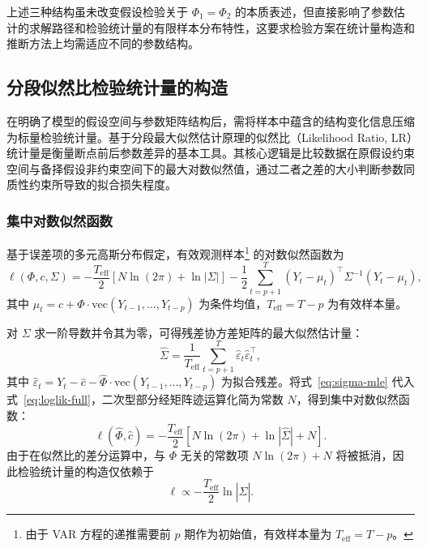 上述三种结构虽未改变假设检验关于 $\Phi_1 = \Phi_2$ 的本质表述，但直接影响了参数估计的求解路径和检验统计量的有限样本分布特性，这要求检验方案在统计量构造和推断方法上均需适应不同的参数结构。


\subsection{分段似然比检验统计量的构造}\label{subsec:lr-statistic}

在明确了模型的假设空间与参数矩阵结构后，需将样本中蕴含的结构变化信息压缩为标量检验统计量。基于分段最大似然估计原理的似然比（Likelihood Ratio, LR）统计量是衡量断点前后参数差异的基本工具。其核心逻辑是比较数据在原假设约束空间与备择假设非约束空间下的最大对数似然值，通过二者之差的大小判断参数同质性约束所导致的拟合损失程度。

\subsubsection{集中对数似然函数}

基于误差项的多元高斯分布假定，有效观测样本\footnote{由于 VAR 方程的递推需要前 $p$ 期作为初始值，有效样本量为 $T_{\text{eff}} = T - p$。} 的对数似然函数为
\begin{equation}\label{eq:loglik-full}
    \ell(\Phi, c, \Sigma) = -\frac{T_{\text{eff}}}{2} \left[ N \ln(2\pi) + \ln|\Sigma| \right] - \frac{1}{2} \sum_{t=p+1}^{T} (Y_t - \mu_t)^\top \Sigma^{-1} (Y_t - \mu_t),
\end{equation}
其中 $\mu_t = c + \Phi \cdot \mathrm{vec}(Y_{t-1}, \ldots, Y_{t-p})$ 为条件均值，$T_{\text{eff}} = T - p$ 为有效样本量。

对 $\Sigma$ 求一阶导数并令其为零，可得残差协方差矩阵的最大似然估计量：
\begin{equation}\label{eq:sigma-mle}
    \hat{\Sigma} = \frac{1}{T_{\text{eff}}} \sum_{t=p+1}^{T} \hat{\varepsilon}_t \hat{\varepsilon}_t^\top,
\end{equation}
其中 $\hat{\varepsilon}_t = Y_t - \hat{c} - \hat{\Phi} \cdot \mathrm{vec}(Y_{t-1}, \ldots, Y_{t-p})$ 为拟合残差。将式~\eqref{eq:sigma-mle} 代入式~\eqref{eq:loglik-full}，二次型部分经矩阵迹运算化简为常数 $N$，得到集中对数似然函数：
\begin{equation}\label{eq:concentrated-loglik}
    \ell(\hat{\Phi}, \hat{c}) = -\frac{T_{\text{eff}}}{2} \left[ N \ln(2\pi) + \ln|\hat{\Sigma}| + N \right].
\end{equation}
由于在似然比的差分运算中，与 $\Phi$ 无关的常数项 $N\ln(2\pi) + N$ 将被抵消，因此检验统计量的构造仅依赖于
\begin{equation}\label{eq:loglik-core}
    \ell \propto -\frac{T_{\text{eff}}}{2} \ln|\hat{\Sigma}|.
\end{equation}

